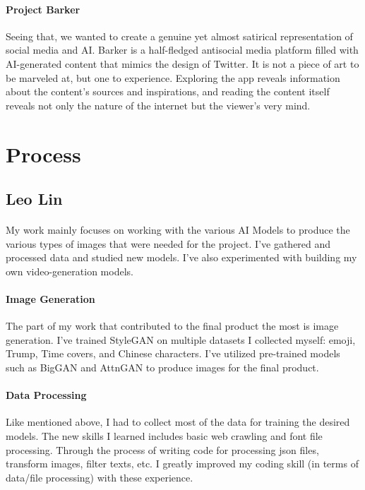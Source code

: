 \documentclass[12pt, letterpaper]{article}
\begin{document}
\paragraph{Project Barker}Seeing that, we wanted to create a genuine yet almost satirical representation of social media and AI. Barker is a half-fledged antisocial media platform filled with AI-generated content that mimics the design of Twitter. It is not a piece of art to be marveled at, but one to experience. Exploring the app reveals information about the content’s sources and inspirations, and reading the content itself reveals not only the nature of the internet but the viewer’s very mind.

\section{Process}

\subsection{Leo Lin}

\paragraph{}My work mainly focuses on working with the various AI Models to produce the various types of images that were needed for the project. I've gathered and processed data and studied new models. I've also experimented with building my own video-generation models.

\paragraph{Image Generation}The part of my work that contributed to the final product the most is image generation. I've trained StyleGAN on multiple datasets I collected myself: emoji, Trump, Time covers, and Chinese characters. I've utilized pre-trained models such as BigGAN and AttnGAN to produce images for the final product. 

\paragraph{Data Processing}Like mentioned above, I had to collect most of the data for training the desired models. The new skills I learned includes basic web crawling and font file processing. Through the process of writing code for processing json files, transform images, filter texts, etc. I greatly improved my coding skill (in terms of data/file processing) with these experience.
\end{document}
